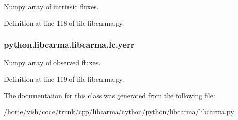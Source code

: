 Numpy array of intrinsic fluxes. 



Definition at line 118 of file libcarma.\-py.

\hypertarget{classpython_1_1libcarma_1_1libcarma_1_1lc_a8b0494641d0d12c1351dae5bdb445138}{
\subsubsection[{yerr}]{\setlength{\rightskip}{0pt plus 5cm}python.\-libcarma.\-libcarma.\-lc.\-yerr}}\label{classpython_1_1libcarma_1_1libcarma_1_1lc_a8b0494641d0d12c1351dae5bdb445138}


Numpy array of observed fluxes. 



Definition at line 119 of file libcarma.\-py.



The documentation for this class was generated from the following file\-:\begin{DoxyCompactItemize}
\item 
/home/vish/code/trunk/cpp/libcarma/cython/python/libcarma/\hyperlink{libcarma_8py}{libcarma.\-py}\end{DoxyCompactItemize}
